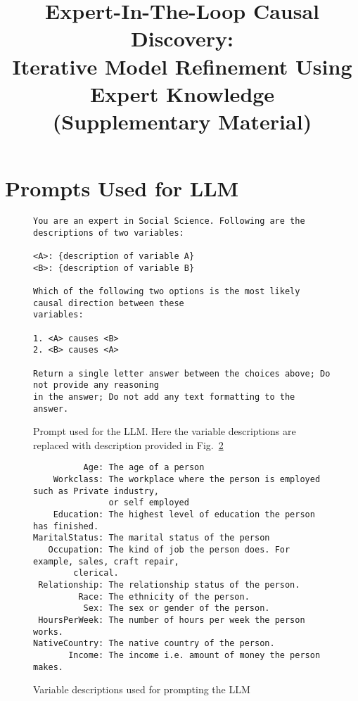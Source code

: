 \onecolumn
\title{Expert-In-The-Loop Causal Discovery: \\
Iterative Model Refinement Using Expert Knowledge \\ (Supplementary Material)}
\maketitle
\appendix

\section{Prompts Used for LLM}
\label{section:llms}

\begin{figure}[ht!]
	\centering
	\begin{verbatim}
You are an expert in Social Science. Following are the descriptions of two variables:

<A>: {description of variable A}
<B>: {description of variable B}

Which of the following two options is the most likely causal direction between these 
variables:

1. <A> causes <B>
2. <B> causes <A>

Return a single letter answer between the choices above; Do not provide any reasoning 
in the answer; Do not add any text formatting to the answer.
	\end{verbatim}
	\caption{Prompt used for the LLM. Here the variable descriptions are replaced with description provided in Fig.~\ref{fig:var_description}}
	\label{fig:prompt}
\end{figure}

\begin{figure}[ht!]
	\begin{verbatim}
          Age: The age of a person
    Workclass: The workplace where the person is employed such as Private industry, 
     	       or self employed
    Education: The highest level of education the person has finished.
MaritalStatus: The marital status of the person
   Occupation: The kind of job the person does. For example, sales, craft repair, 
   		clerical.
 Relationship: The relationship status of the person.
         Race: The ethnicity of the person.
          Sex: The sex or gender of the person.
 HoursPerWeek: The number of hours per week the person works.
NativeCountry: The native country of the person.
       Income: The income i.e. amount of money the person makes.
	\end{verbatim}
	\caption{Variable descriptions used for prompting the LLM}
	\label{fig:var_description}
\end{figure}

